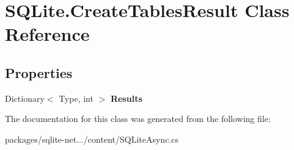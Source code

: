 \hypertarget{classSQLite_1_1CreateTablesResult}{\section{S\-Q\-Lite.\-Create\-Tables\-Result Class Reference}
\label{classSQLite_1_1CreateTablesResult}
}
\subsection*{Properties}
\begin{DoxyCompactItemize}
\item 
\hypertarget{classSQLite_1_1CreateTablesResult_abb0d5f9240feefb2667498fa550ffb38}{Dictionary$<$ Type, int $>$ {\bfseries Results}}\label{classSQLite_1_1CreateTablesResult_abb0d5f9240feefb2667498fa550ffb38}

\end{DoxyCompactItemize}


The documentation for this class was generated from the following file\-:\begin{DoxyCompactItemize}
\item 
packages/sqlite-\/net.../content/S\-Q\-Lite\-Async.\-cs\end{DoxyCompactItemize}
